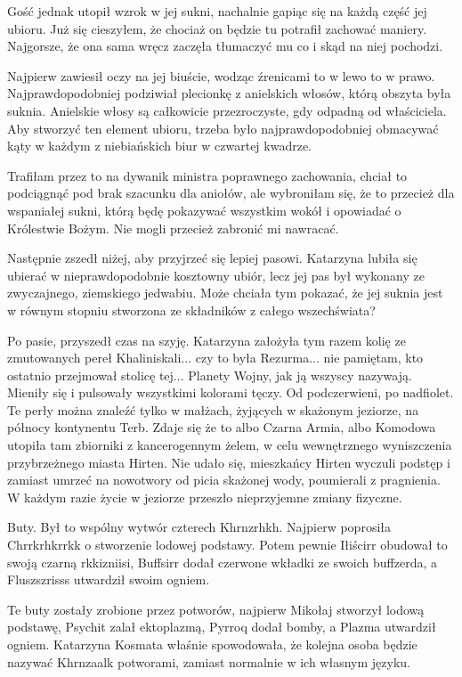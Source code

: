 Gość jednak utopił wzrok w jej sukni, nachalnie gapiąc się na każdą część jej ubioru. 
Już się cieszyłem, że chociaż on będzie tu potrafił zachować maniery.
Najgorsze, że ona sama wręcz zaczęła tłumaczyć mu co i skąd na niej pochodzi.

Najpierw zawiesił oczy na jej biuście, wodząc źrenicami to w lewo to w prawo. 
Najprawdopodobniej podziwiał plecionkę z anielskich włosów, którą obszyta była suknia.
Anielskie włosy są całkowicie przezroczyste, gdy odpadną od właściciela.
Aby stworzyć ten element ubioru, trzeba było najprawdopodobniej obmacywać kąty w każdym z niebiańskich biur w czwartej kwadrze.

\ds{} Trafiłam przez to na dywanik ministra poprawnego zachowania, chciał to podciągnąć pod brak szacunku dla aniołów, ale wybroniłam się, że to przecież dla wspaniałej sukni, którą będę 
pokazywać wszystkim wokół i opowiadać o Królestwie Bożym. Nie mogli przecież zabronić mi nawracać. \de{}

Następnie zszedł niżej, aby przyjrzeć się lepiej pasowi.
Katarzyna lubiła się ubierać w nieprawdopodobnie kosztowny ubiór, lecz jej pas był wykonany ze zwyczajnego, ziemskiego jedwabiu.
Może chciała tym pokazać, że jej suknia jest w równym stopniu stworzona ze składników z całego wszechświata?

Po pasie, przyszedł czas na szyję. Katarzyna założyła tym razem kolię ze zmutowanych pereł Khaliniskali...
czy to była Rezurma... nie pamiętam, kto ostatnio przejmował stolicę tej... Planety Wojny, jak ją wszyscy nazywają.
Mieniły się i pulsowały wszystkimi kolorami tęczy. Od podczerwieni, po nadfiolet.
Te perły można znaleźć tylko w małżach, żyjących w skażonym jeziorze, na północy kontynentu Terb.
Zdaje się że to albo Czarna Armia, albo Komodowa utopiła tam zbiorniki z kancerogennym żelem, w celu wewnętrznego wyniszczenia przybrzeżnego miasta Hirten.
Nie udało się, mieszkańcy Hirten wyczuli podstęp i zamiast umrzeć na nowotwory od picia skażonej wody, poumierali z pragnienia.
W każdym razie życie w jeziorze przeszło nieprzyjemne zmiany fizyczne.

Buty. Był to wspólny wytwór czterech Khrnzrhkh.
Najpierw poprosiła Chrrkrhkrrkk o stworzenie lodowej podstawy.
Potem pewnie Iłiścirr obudował to swoją czarną rkkizniisi, Buffsirr dodał czerwone wkładki ze swoich buffzerda, a Fluszszrisss utwardził swoim ogniem.

\ds{} Te buty zostały zrobione przez potworów, najpierw Mikołaj stworzył lodową podstawę, Psychit zalał ektoplazmą, Pyrroq dodał bomby, a Plazma utwardził ogniem. \dm{}
Katarzyna Kosmata właśnie spowodowała, że kolejna osoba będzie nazywać Khrnzaalk potworami, zamiast normalnie w ich własnym języku. \de{}

